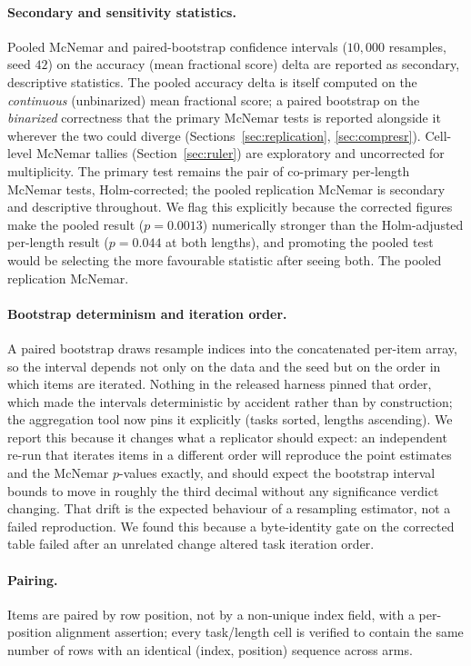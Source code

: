 \documentclass[11pt]{article}
\begin{document}
\paragraph{Secondary and sensitivity statistics.} Pooled McNemar and paired-bootstrap confidence
intervals ($10{,}000$ resamples, seed $42$) on the accuracy (mean fractional score) delta are
reported as secondary, descriptive statistics. The pooled accuracy delta is itself computed on the
\emph{continuous} (unbinarized) mean fractional score; a paired bootstrap on the
\emph{binarized} correctness that the primary McNemar tests is reported alongside it wherever
the two could diverge (Sections~\ref{sec:replication}, \ref{sec:compresr}).
Cell-level McNemar tallies (Section~\ref{sec:ruler}) are exploratory and uncorrected for
multiplicity. The primary test remains the pair of co-primary per-length McNemar tests,
Holm-corrected; the pooled replication McNemar is secondary and descriptive throughout. We flag
this explicitly because the corrected figures make the pooled result ($p{=}0.0013$) numerically
stronger than the Holm-adjusted per-length result ($p{=}0.044$ at both lengths), and promoting the
pooled test would be selecting the more favourable statistic after seeing both. The pooled replication
McNemar.

\paragraph{Bootstrap determinism and iteration order.} A paired bootstrap draws resample indices
into the concatenated per-item array, so the interval depends not only on the data and the seed
but on the order in which items are iterated. Nothing in the released harness pinned that order,
which made the intervals deterministic by accident rather than by construction; the aggregation
tool now pins it explicitly (tasks sorted, lengths ascending). We report this because it changes
what a replicator should expect: an independent re-run that iterates items in a different order
will reproduce the point estimates and the McNemar $p$-values exactly, and should expect the
bootstrap interval bounds to move in roughly the third decimal without any significance verdict
changing. That drift is the expected behaviour of a resampling estimator, not a failed
reproduction. We found this because a byte-identity gate on the corrected table failed after an
unrelated change altered task iteration order.

\paragraph{Pairing.} Items are paired by row position, not by a non-unique index field, with a
per-position alignment assertion; every task/length cell is verified to contain the same number of
rows with an identical (index, position) sequence across arms.



\end{document}
